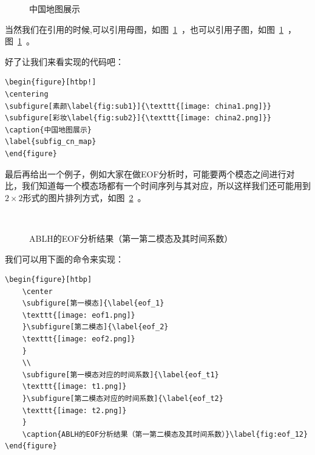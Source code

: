 \begin{figure}[htbp!]
\centering
{}
\caption{中国地图展示}
\label{subfig_cn_map}
\end{figure}

当然我们在引用的时候,可以引用母图，如图~\ref{subfig_cn_map}~，也可以引用子图，如图~\ref{subfig_cn_map}~，图~\ref{subfig_cn_map}~。

好了让我们来看实现的代码吧：

{\color{green!50!black}
\begin{lstlisting}[breaklines=true,]
\begin{figure}[htbp!]
\centering
\subfigure[素颜\label{fig:sub1}]{\texttt{[image: china1.png]}}
\subfigure[彩妆\label{fig:sub2}]{\texttt{[image: china2.png]}}
\caption{中国地图展示}
\label{subfig_cn_map}
\end{figure}
\end{lstlisting}
}

最后再给出一个例子，例如大家在做EOF分析时，可能要两个模态之间进行对比，我们知道每一个模态场都有一个时间序列与其对应，所以这样我们还可能用到$2\times 2$形式的图片排列方式，如图~\ref{fig:eof_12}~。

\begin{figure}[htbp]

\center
{}
\\
\caption{ABLH的EOF分析结果（第一第二模态及其时间系数）}\label{fig:eof_12}
\end{figure}

我们可以用下面的命令来实现：

{\color{green!50!black}
\begin{lstlisting}[breaklines=true,]
\begin{figure}[htbp]
    \center
    \subfigure[第一模态]{\label{eof_1}
    \texttt{[image: eof1.png]}
    }\subfigure[第二模态]{\label{eof_2}
    \texttt{[image: eof2.png]}
    }
    \\
    \subfigure[第一模态对应的时间系数]{\label{eof_t1}
    \texttt{[image: t1.png]}
    }\subfigure[第二模态对应的时间系数]{\label{eof_t2}
    \texttt{[image: t2.png]}
    }
    \caption{ABLH的EOF分析结果（第一第二模态及其时间系数）}\label{fig:eof_12}
\end{figure}
\end{lstlisting}
}

